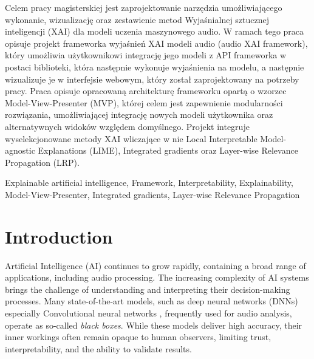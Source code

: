\documentclass[
    bindingoffset=5mm,  %
    footnoteindent=3mm, %
    hyphenation=true    %
]{src/wut-thesis}
\begin{document}
Celem pracy magisterskiej jest zaprojektowanie narzędzia umożliwiającego wykonanie,
wizualizację oraz zestawienie metod Wyjaśnialnej sztucznej inteligencji (XAI) dla modeli uczenia maszynowego audio.
W ramach tego praca opisuje projekt frameworka wyjaśnień XAI modeli audio (audio XAI framework),
który umożliwia użytkownikowi integrację jego modeli z API frameworka w postaci biblioteki,
która następnie wykonuje wyjaśnienia na modelu, a następnie wizualizuje je w interfejsie
webowym, który został zaprojektowany na potrzeby pracy. Praca opisuje opracowaną architekturę frameworku
opartą o wzorzec Model-View-Presenter (MVP), której celem jest zapewnienie modularności rozwiązania, umożliwiającej
integrację nowych modeli użytkownika oraz alternatywnych widoków względem domyślnego.
Projekt integruje wyselekcjonowane metody XAI wliczające w nie Local Interpretable Model-agnostic Explanations (LIME),
Integrated gradients oraz Layer-wise Relevance Propagation (LRP).


\secondkeywords Explainable artificial intelligence, Framework, Interpretability, Explainability, Model-View-Presenter, Integrated gradients, Layer-wise Relevance Propagation

\pagestyle{plain}

\cleardoublepage %
\tableofcontents

\cleardoublepage %
\pagestyle{headings}

%
%
\clearpage %
\section{Introduction} \label{ch:introduction}

Artificial Intelligence (AI) continues to grow rapidly, containing a broad range of applications,
including audio processing. The increasing complexity of AI systems brings the challenge of understanding
and interpreting their decision-making processes. Many state-of-the-art models, such as deep
neural networks (DNNs) especially Convolutional neural networks \cite{Lecun1998},
frequently used for audio analysis, operate as so-called \emph{black boxes}. While these models deliver high accuracy,
their inner workings often remain opaque to human observers, limiting trust, interpretability,
and the ability to validate results.
\end{document}
